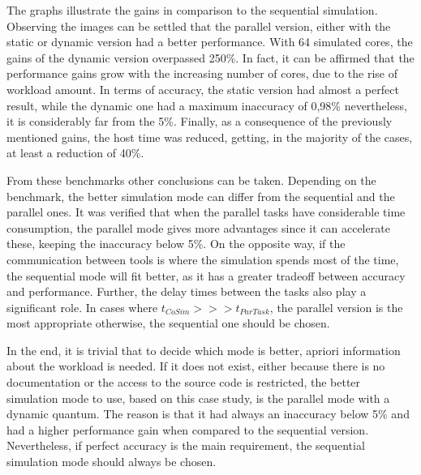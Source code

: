 The graphs illustrate the gains in comparison to the sequential simulation. Observing the images can be settled that the parallel version, either 
with the static or dynamic version had a better performance. With 64 simulated cores, the gains of the dynamic version overpassed 250\%. 
In fact, it can be affirmed that the performance gains grow with the increasing number of cores, due to the rise of workload amount. 
In terms of accuracy, the static version had almost a perfect result, while the dynamic one had 
a maximum inaccuracy of 0,98\% nevertheless, it is considerably far from the 5\%. Finally, as a consequence of the previously mentioned gains,
the host time was reduced, getting, in the majority of the cases, at least a reduction of 40\%. 


From these benchmarks other conclusions can be taken. Depending on the benchmark, the better simulation mode can differ from the sequential and
the parallel ones. It was verified that when the parallel tasks have considerable time consumption, the parallel mode gives more advantages 
since it can accelerate these, keeping the inaccuracy below 5\%. On the opposite way, if the communication between tools is where the simulation 
spends most of the time, the sequential mode will fit better, as it has a greater tradeoff between accuracy and performance. Further, the delay
times between the tasks also play a significant role. In cases where $t_{CoSim} >>> t_{ParTask}$, the parallel version is the most appropriate
otherwise, the sequential one should be chosen. 

In the end, it is trivial that to decide which mode is better, apriori information about the workload is needed.
If it does not exist, either because there is no documentation or the access to the source code is restricted, the better simulation mode to use, 
based on this case study, is the parallel mode with a dynamic quantum. The reason is that it had always an inaccuracy below 5\% and 
had a higher performance gain when compared to the sequential version. Nevertheless, if perfect accuracy is the main requirement, the 
sequential simulation mode should always be chosen.




